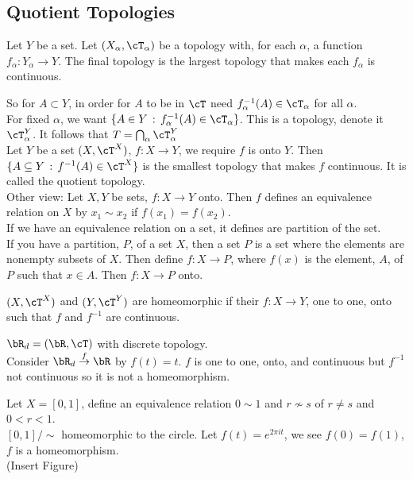 
\subsection{Quotient Topologies} 

\begin{definition}
    Let $Y$ be a set. Let $(X_{\alpha}, \cT_{\alpha})$ be a topology with, for each $\alpha$, a function $f_{\alpha}: Y_{\alpha} \to Y$. The final topology is the largest topology that makes each $f_{\alpha}$ is continuous. 
\end{definition} 

\noindent
So for $A \subset Y$, in order for $A$ to be in $\cT$ need $f_{\alpha}^{-1}(A) \in \cT_{\alpha}$ for all $\alpha$. \\
For fixed $\alpha$, we want $\{A \in Y \, : \, f^{-1}_{\alpha}(A) \in \cT_{\alpha}\}$. This is a topology, denote it $\cT^Y_{\alpha}$. It follows that $T = \bigcap_{\alpha}\cT_{\alpha}^Y$ \\
Let $Y$ be a set $(X, \cT^X)$, $f: X \to Y$, we require $f$ is onto $Y$. Then $\{A \subseteq Y \, : \, f^{-1}(A) \in \cT^X\} $ is the smallest topology that makes $f$ continuous. It is called the quotient topology. \\

\noindent
Other view: Let $X,Y$ be sets, $f: X \to Y$ onto. Then $f$ defines an equivalence relation on $X$ by $x_1 \sim x_2$ if $f(x_1)=f(x_2)$. \\
If we have an equivalence relation on a set, it defines are partition of the set. \\
If you have a partition, $P$, of a set $X$, then a set $P$ is a set where the elements are nonempty subsets of $X$. Then define $f: X \to P$, where $f(x)$ is the element, $A$, of $P$ such that $x \in A$. Then $f: X \to P$ onto. 

\begin{definition}
    $(X, \cT^X)$ and $(Y, \cT^Y)$ are homeomorphic if their $f: X \to Y$, one to one, onto such that $f$ and $f^{-1}$ are continuous. 
\end{definition} 

\begin{example}
    $\bR_d = (\bR, \cT)$ with discrete topology. \\
    Consider $\bR_d \stackrel{f}{\to} \bR$ by $f(t)=t$. $f$ is one to one, onto, and continuous but $f^{-1}$ not continuous so it is not a homeomorphism. 
\end{example}

\begin{example}
    Let $X = [0,1]$, define an equivalence relation $0 \sim 1$ and $r \not\sim s$ of $r \neq s$ and $0 < r < 1$. \\
    $[0,1]/\sim$ homeomorphic to the circle. Let $f(t) = e^{2 \pi i t}$, we see $f(0)=f(1)$, $f$ is a homeomorphism. \\
    (Insert Figure)
\end{example}

